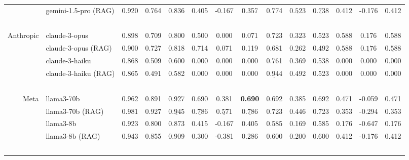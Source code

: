 \begin{table*}[ht]
\begin{tabular}{r|lccc|ccc|ccc|ccc}
        ~       & gemini-1.5-pro (RAG)   & 0.920 & 0.764 & 0.836 & 0.405 & -0.167  & 0.357 & 0.774 & $\underline{0.523}$ & $\underline{0.738}$ & 0.412 & -0.176 & 0.412 \\ 
        ~       & ~                      & ~ & ~ & ~ & ~  & ~ & ~ & ~ & ~ & ~ & ~  & ~ & ~ \\
        Anthropic & claude-3-opus        & 0.898 & 0.709  & 0.800 & 0.500 & 0.000  & 0.071 & 0.723 & 0.323 & 0.523 & 0.588 & 
        0.176
        & 
        0.588
        \\ 
        ~         & claude-3-opus (RAG)  & 0.900  & 0.727 & 0.818 & 0.714 & 0.071 & 0.119 & 0.681 & 0.262 & 0.492 & $\underline{0.588}$ & $\underline{0.176}$ & $\underline{0.588}$\\ 
        ~         & claude-3-haiku       & 0.868 & 0.509  & 0.600 & 0.000  & 0.000 & 0.000 & 0.761 & 0.369 & 0.538 & 0.000 & 0.000  & 0.000\\ 
         ~        & claude-3-haiku (RAG) & 0.865  & 0.491 & 0.582 & 0.000  & 0.000 & 0.000 & $\underline{0.944}$ & 0.492 & 0.523 & 0.000 & 0.000  & 0.000 \\ 
        ~         & ~                    & ~ & ~ & ~ & ~  & ~ & ~ & ~ & ~ & ~ & ~  & ~ & ~ \\
        Meta    & llama3-70b             & 0.962 & 0.891  & 0.927 & 0.690 & 0.381  & \textbf{0.690} & 0.692 & 0.385 & 0.692 & 0.471 & -0.059 & 0.471\\ 
         ~      & llama3-70b (RAG)       & 0.981 & 0.927 & $\underline{0.945}$ & $\underline{0.786}$ & $\underline{0.571}$ & $\underline{0.786}$ & 0.723 & 0.446 & 0.723 & 0.353 & -0.294 & 0.353 \\ 
        ~       & llama3-8b              & 0.923 & 0.800  & 0.873 & 0.415 & -0.167 & 0.405 & 0.585 & 0.169 & 0.585 & 0.176 & -0.647 & 0.176 \\ 
         ~      & llama3-8b (RAG)        & 0.943 & 0.855 & 0.909 & 0.300 & -0.381 & 0.286 & 0.600 & 0.200  & 0.600 & 0.412 & -0.176 & 0.412 \\ 
        ~       & ~                      & ~ & ~ & ~ & ~  & ~ & ~ & ~ & ~ & ~ & ~  & ~ & ~ \\

\end{tabular}
\end{table*}
